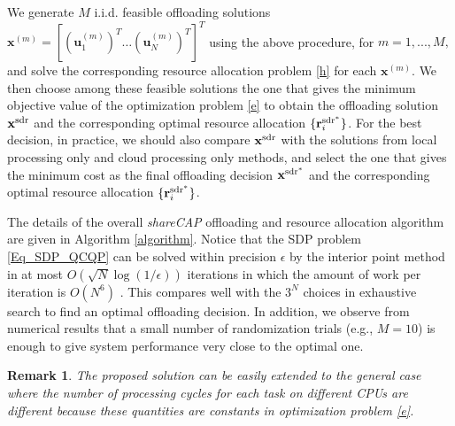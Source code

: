 \documentclass[10pt,journal,compsoc]{IEEEtran}
\newtheorem{Remark}{Remark}
\def\rbf{{\bf r}}
\def\xbf{{\bf x}}
\def\rbf{{\bf r}}
\def\xbf{{\bf x}}
\begin{document}
{ We
generate $M$ i.i.d. feasible offloading solutions
$\mathbf{x}^{(m)}=[(\mathbf{u}_1^{(m)})^T\ldots
(\mathbf{u}_N^{(m)})^T]^T$ using the above procedure, for $m = 1,
..., M,$ and solve the corresponding resource allocation problem
\eqref{h} for each $\mathbf{x}^{(m)}$. We then choose among these
feasible solutions the one that gives the minimum objective value of
the optimization problem \eqref{e} to obtain the offloading solution
$\xbf^{\mathrm{sdr}}$ and the corresponding optimal resource
allocation $\{\rbf_i^{\mathrm{sdr}^*}\}$. For the best decision, in
practice, we should also compare $\xbf^{\mathrm{sdr}}$ with the
solutions from local processing only and cloud processing only
methods, and select the one that gives the minimum cost as the final
offloading decision $\xbf^{\mathrm{sdr}^*}$ and the corresponding
optimal resource allocation $\{\rbf_i^{\mathrm{sdr}^*}\}$.

The details of the overall \textit{shareCAP} offloading and resource
allocation algorithm are given in Algorithm \ref{algorithm}. Notice
that the SDP problem \eqref{Eq_SDP_QCQP} can be solved within
precision $\epsilon$ by the interior point method in at most
$O(\sqrt{N}\log(1/\epsilon))$ iterations in which the amount of work
per iteration is $O(N^{6})$ \cite{nesterov1994}. This compares well
with the $3^N$ choices in exhaustive search to find an optimal
offloading decision. In addition, we observe from numerical results
that a small number of randomization trials (e.g., $M=10$) is enough
to give system performance very close to the optimal one.

\begin{Remark} \label{remark processing_cycle}\it The proposed
solution can be easily extended to the general case where the number
of processing cycles for each task on different CPUs are different
because these quantities are constants in optimization problem
\eqref{e}.
\end{Remark}


}
\end{document}
